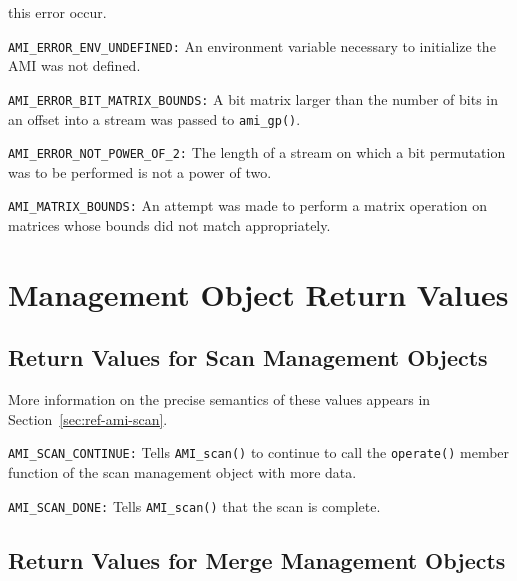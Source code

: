 \begin{description}
  this error occur. 
\item\lstinline|AMI_ERROR_ENV_UNDEFINED:|
  An environment variable necessary to initialize the AMI was not defined.
\item\lstinline|AMI_ERROR_BIT_MATRIX_BOUNDS:|
  A bit matrix larger than the number of bits in an offset into a
  stream was passed to \lstinline|ami_gp()|.
\item\lstinline|AMI_ERROR_NOT_POWER_OF_2:|
  The length of a stream on which a bit permutation was to be
  performed is not a power of two.
\item\lstinline|AMI_MATRIX_BOUNDS:| An attempt was made to perform a
  matrix operation on matrices whose bounds did not match appropriately.
\end{description}

\section{Management Object Return Values}

\subsection{Return Values for Scan Management Objects}


More information on the precise semantics of these values appears in
Section~\ref{sec:ref-ami-scan}.
\begin{description}
\item\lstinline|AMI_SCAN_CONTINUE:|  Tells \lstinline|AMI_scan()| to continue
  to call the \lstinline|operate()| member function of the scan management
  object with more data.
\item\lstinline|AMI_SCAN_DONE:|  Tells \lstinline|AMI_scan()| that the scan is
  complete. 
\end{description}

\subsection{Return Values for Merge Management Objects}

